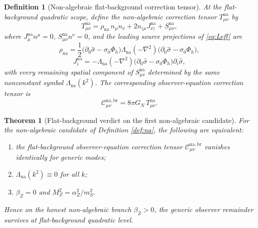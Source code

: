 \documentclass[11pt]{article}
\newtheorem{definition}{Definition}
\newtheorem{theorem}{Theorem}
\begin{document}
\begin{definition}[Non-algebraic flat-background correction tensor]
\label{def:Tna}
At the flat-background quadratic scope, define the \emph{non-algebraic correction tensor} \(T_{\mu\nu}^{\mathrm{na}}\) by
\begin{equation}
T_{\mu\nu}^{\mathrm{na}}
=
\rho_{\mathrm{na}}\,n_\mu n_\nu
+2n_{(\mu}J_{\nu)}^{\mathrm{na}}
+S_{\mu\nu}^{\mathrm{na}},
\label{eq:Tna}
\end{equation}
where \(J_\mu^{\mathrm{na}}n^\mu=0\), \(S_{\mu\nu}^{\mathrm{na}}n^\nu=0\), and the leading source projections of \eqref{eq:Leff} are
\begin{equation}
\rho_{\mathrm{na}}
=
\frac12
\bigl(\partial_0\hat\sigma-\sigma_0\Phi_h\bigr)
\Lambda_{\mathrm{na}}(-\nabla^2)
\bigl(\partial_0\hat\sigma-\sigma_0\Phi_h\bigr),
\label{eq:rhona}
\end{equation}
\begin{equation}
J_i^{\mathrm{na}}
=
-\Lambda_{\mathrm{na}}(-\nabla^2)
\bigl(\partial_0\hat\sigma-\sigma_0\Phi_h\bigr)\partial_i\hat\sigma,
\label{eq:Jna}
\end{equation}
with every remaining spatial component of \(S_{\mu\nu}^{\mathrm{na}}\) determined by the same nonconstant symbol \(\Lambda_{\mathrm{na}}(k^2)\). The corresponding observer-equation correction tensor is
\begin{equation}
\mathcal C_{\mu\nu}^{\mathrm{na,br}}
=
8\pi G_N\,T_{\mu\nu}^{\mathrm{na}}.
\label{eq:Cna}
\end{equation}
\end{definition}

\begin{theorem}[Flat-background verdict on the first non-algebraic candidate]
\label{thm:verdict}
For the non-algebraic candidate of Definition \ref{def:na}, the following are equivalent:
\begin{enumerate}
    \item the flat-background observer-equation correction tensor \(\mathcal C_{\mu\nu}^{\mathrm{na,br}}\) vanishes identically for generic modes;
    \item \(\Lambda_{\mathrm{na}}(k^2)\equiv 0\) for all \(k\);
    \item \(\beta_Z=0\) and \(M_Z^2=\alpha_Z^2/m_S^2\).
\end{enumerate}
Hence on the honest non-algebraic branch \(\beta_Z>0\), the generic observer remainder survives at flat-background quadratic level.
\end{theorem}
\end{document}
